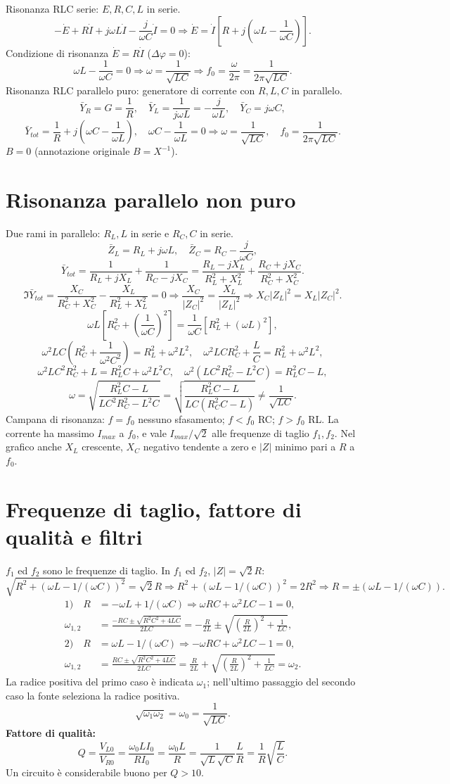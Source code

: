 \documentclass[11pt,a4paper]{article}
\newcommand{\pagina}[2]{\clearpage\section*{#2}}
\begin{document}
Risonanza RLC serie: $E,R,C,L$ in serie.
\[-\dot E+R\dot I+j\omega L\dot I-\frac j{\omega C}\dot I=0\Rightarrow\dot E=\dot I\left[R+j\left(\omega L-\frac1{\omega C}\right)\right].\]
Condizione di risonanza $\dot E=R\dot I$ ($\Delta\varphi=0$):
\[\omega L-\frac1{\omega C}=0\Rightarrow\omega=\frac1{\sqrt{LC}}\Rightarrow f_0=\frac\omega{2\pi}=\frac1{2\pi\sqrt{LC}}.\]
Risonanza RLC parallelo puro: generatore di corrente con $R,L,C$ in parallelo.
\[\bar Y_R=G=\frac1R,\quad\bar Y_L=\frac1{j\omega L}=-\frac j{\omega L},\quad\bar Y_C=j\omega C,\]
\[\bar Y_{tot}=\frac1R+j\left(\omega C-\frac1{\omega L}\right),\quad\omega C-\frac1{\omega L}=0\Rightarrow\omega=\frac1{\sqrt{LC}},\quad f_0=\frac1{2\pi\sqrt{LC}}.\]
$B=0$ (annotazione originale $B=X^{-1}$).
\pagina{30}{Risonanza parallelo non puro}
Due rami in parallelo: $R_L,L$ in serie e $R_C,C$ in serie.
\[\bar Z_L=R_L+j\omega L,\quad\bar Z_C=R_C-\frac j{\omega C},\]
\[\bar Y_{tot}=\frac1{R_L+jX_L}+\frac1{R_C-jX_C}=\frac{R_L-jX_L}{R_L^2+X_L^2}+\frac{R_C+jX_C}{R_C^2+X_C^2}.\]
\[\Im\bar Y_{tot}=\frac{X_C}{R_C^2+X_C^2}-\frac{X_L}{R_L^2+X_L^2}=0\Rightarrow\frac{X_C}{|Z_C|^2}=\frac{X_L}{|Z_L|^2}\Rightarrow X_C|Z_L|^2=X_L|Z_C|^2.\]
\[\omega L\left[R_C^2+\left(\frac1{\omega C}\right)^2\right]=\frac1{\omega C}[R_L^2+(\omega L)^2],\]
\[\omega^2LC\left(R_C^2+\frac1{\omega^2C^2}\right)=R_L^2+\omega^2L^2,\quad\omega^2LCR_C^2+\frac LC=R_L^2+\omega^2L^2,\]
\[\omega^2LC^2R_C^2+L=R_L^2C+\omega^2L^2C,\quad\omega^2(LC^2R_C^2-L^2C)=R_L^2C-L,\]
\[\omega=\sqrt{\frac{R_L^2C-L}{LC^2R_C^2-L^2C}}=\sqrt{\frac{R_L^2C-L}{LC(R_C^2C-L)}}\ne\frac1{\sqrt{LC}}.\]
Campana di risonanza: $f=f_0$ nessuno sfasamento; $f<f_0$ RC; $f>f_0$ RL. La corrente ha massimo $I_{max}$ a $f_0$, e vale $I_{max}/\sqrt2$ alle frequenze di taglio $f_1,f_2$. Nel grafico anche $X_L$ crescente, $X_C$ negativo tendente a zero e $|Z|$ minimo pari a $R$ a $f_0$.
\pagina{31}{Frequenze di taglio, fattore di qualità e filtri}
$f_1$ ed $f_2$ sono le frequenze di taglio. In $f_1$ ed $f_2$, $|Z|=\sqrt2R$:
\[\sqrt{R^2+(\omega L-1/(\omega C))^2}=\sqrt2R\Rightarrow R^2+(\omega L-1/(\omega C))^2=2R^2\Rightarrow R=\pm(\omega L-1/(\omega C)).\]
\begin{align*}
1)\quad R&=-\omega L+1/(\omega C)\Rightarrow\omega RC+\omega^2LC-1=0,\\
\omega_{1,2}&=\frac{-RC\pm\sqrt{R^2C^2+4LC}}{2LC}=-\frac R{2L}\pm\sqrt{\left(\frac R{2L}\right)^2+\frac1{LC}},\\
2)\quad R&=\omega L-1/(\omega C)\Rightarrow-\omega RC+\omega^2LC-1=0,\\
\omega_{1,2}&=\frac{RC\pm\sqrt{R^2C^2+4LC}}{2LC}=\frac R{2L}+\sqrt{\left(\frac R{2L}\right)^2+\frac1{LC}}=\omega_2.
\end{align*}
La radice positiva del primo caso è indicata $\omega_1$; nell'ultimo passaggio del secondo caso la fonte seleziona la radice positiva.
\[\sqrt{\omega_1\omega_2}=\omega_0=\frac1{\sqrt{LC}}.\]
\textbf{Fattore di qualità:}
\[Q=\frac{V_{L0}}{V_{R0}}=\frac{\omega_0LI_0}{RI_0}=\frac{\omega_0L}{R}=\frac1{\sqrt L\sqrt C}\frac{L}{R}=\frac1R\sqrt{\frac LC}.\]
Un circuito è considerabile buono per $Q>10$.
\end{document}
